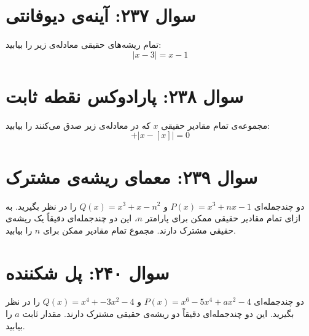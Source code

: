 \documentclass[12pt]{article}
\begin{document}
\section*{سوال ۲۳۷: آینه‌ی دیوفانتی}
تمام ریشه‌های حقیقی معادله‌ی زیر را بیابید:
\begin{displaymath}
	[x]|x-3| = x-1
\end{displaymath}

\vspace{1cm}
\hrulefill
\vspace{1cm}

\section*{سوال ۲۳۸: پارادوکس نقطه ثابت}
مجموعه‌ی تمام مقادیر حقیقی \(x\) که در معادله‌ی زیر صدق می‌کنند را بیابید:
\begin{displaymath}
	[x-|x|] + |x-[x]| = 0
\end{displaymath}

\vspace{1cm}
\hrulefill
\vspace{1cm}

\section*{سوال ۲۳۹: معمای ریشه‌ی مشترک}
دو چندجمله‌ای \( P(x) = x^3 + nx - 1 \) و \( Q(x) = x^3 + x - n^2 \) را در نظر بگیرید. به ازای تمام مقادیر حقیقی ممکن برای پارامتر \(n\)، این دو چندجمله‌ای دقیقاً یک ریشه‌ی حقیقی مشترک دارند. مجموع تمام مقادیر ممکن برای \(n\) را بیابید.

\vspace{1cm}
\hrulefill
\vspace{1cm}

\section*{سوال ۲۴۰: پل شکننده}
دو چندجمله‌ای \( P(x) = x^6 - 5x^4 + ax^2 -4 \) و \( Q(x) = x^4 +-3x^2  -4 \) را در نظر بگیرید. این دو چندجمله‌ای دقیقاً دو ریشه‌ی حقیقی مشترک دارند. مقدار ثابت \(a\) را بیابید.
\end{document}
